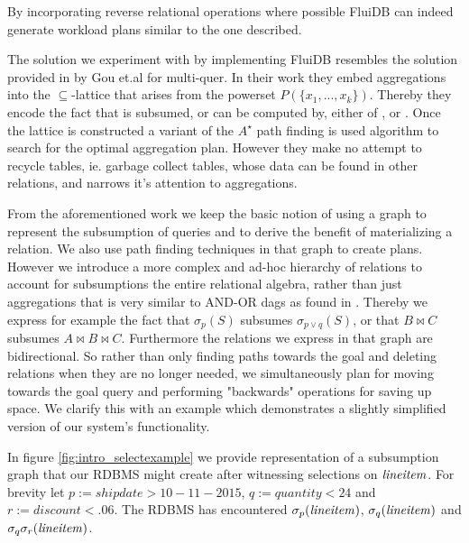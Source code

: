 By incorporating reverse relational operations where possible FluiDB
can indeed generate workload plans similar to the one described.

The solution we experiment with by implementing FluiDB resembles the
solution provided in \cite{gouSupSearchEfficient2006} by Gou et.al for
multi-quer. In their work they embed aggregations  into the \(\subseteq\)-lattice that arises from the powerset
\(P(\{x_1, ..., x_k\})\). Thereby they encode the fact that  is subsumed, or can be computed by, either of ,  or . Once the
lattice is constructed a variant of the \(A^{\star}\) path finding is
used algorithm to search for the optimal aggregation plan. However
they make no attempt to recycle tables, ie. garbage collect tables,
whose data can be found in other relations, and narrows it's attention
to aggregations.

From the aforementioned work we keep the basic notion of using a graph
to represent the subsumption of queries and to derive the benefit of
materializing a relation. We also use path finding techniques in that
graph to create plans. However we introduce a more complex and ad-hoc
hierarchy of relations to account for subsumptions the entire
relational algebra, rather than just aggregations that is very similar
to AND-OR dags as found in
\cite{mistryMaterializedViewSelection2001}. Thereby we express for
example the fact that \(\sigma_p(S)\) subsumes \(\sigma_{p \lor q}(S)\),
or that \(B \Join C\) subsumes \(A \Join B \Join C\). Furthermore the
relations we express in that graph are bidirectional. So rather than
only finding paths towards the goal and deleting relations when they
are no longer needed, we simultaneously plan for moving towards the
goal query and performing "backwards" operations for saving up
space. We clarify this with an example which demonstrates a slightly
simplified version of our system's functionality.

In figure \ref{fig:intro_selectexample} we provide representation of a
subsumption graph that our RDBMS might create after witnessing
selections on \(\mathit{lineitem}\). For brevity let
\(p:=shipdate > 10-11-2015\), \(q:=quantity < 24\) and
\(r:=discount < .06\). The RDBMS has encountered
\(\sigma_{p}(\mathit{lineitem})\), \(\sigma_{q}(\mathit{lineitem})\) and
\(\sigma_{q} \sigma_{r} (\mathit{lineitem})\).


